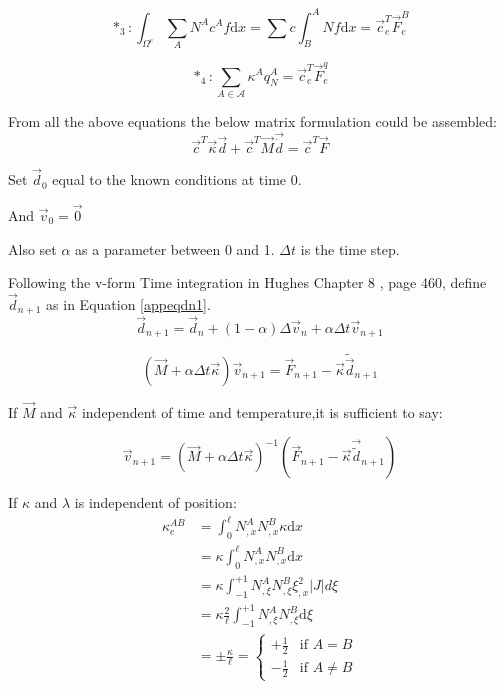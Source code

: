 \begin{equation*}
*_3: \int_{\Omega^e} \sum_A N^A c^A f \text{d}x = \sum c \int_B^A N f \text{d}x = \vec{c}_e^T \vec{F}_e^B
\end{equation*}


\begin{equation*}
*_4: \sum_{A \in \mathcal{A}} \kappa^A q_N^A = \vec{c}_e^T \vec{F}_e^q
\end{equation*}


From all the above equations the below matrix formulation could be assembled:
\begin{equation}\label{appfemdiffeq7}
\vec{c}^T \vec{\kappa} \vec{d} + \vec{c}^T \vec{M} \vec{\dot{d}} = \vec{c}^T \vec{F}
\end{equation}





Set $\vec{d}_0$ equal to the known conditions at time 0.

And $\vec{v}_0 = \vec{0}$ 

Also set $\alpha$ as a parameter between 0 and 1. $\Delta t$ is the time step.


Following the v-form Time integration in Hughes Chapter 8 , page 460, define $\vec{d}_{n+1}$ as in Equation \ref{appeqdn1}.
\begin{equation}\label{appeqdn1}
\vec{d}_{n+1} = \vec{d}_n + (1-\alpha) \Delta \vec{v}_n + \alpha \Delta t \vec{v}_{n+1}
\end{equation}


\begin{equation}
(\vec{M} + \alpha\Delta t \vec{\kappa})\vec{v}_{n+1} = \vec{F}_{n+1} - \vec{\kappa} \tilde{\vec{d}}_{n+1}
\end{equation}


If $\vec{M}$ and $\vec{\kappa}$ independent of time and temperature,it is sufficient to say:

\begin{equation}
\vec{v}_{n+1} = (\vec{M}+\alpha\Delta t \vec{\kappa})^{-1} (\vec{F}_{n+1} - \vec{\kappa} \vec{\tilde{d}}_{n+1})
\end{equation}

If $\kappa$ and $\lambda$ is independent of position:
\begin{equation}
\begin{aligned}
	\kappa_e^{AB} &= \int_0^\ell N_{,x}^A N_{,x}^B \kappa \text{d}x \\
&= \kappa \int_0^\ell N_{,x}^A N_{,x}^B \text{d}x \\
&= \kappa \int_{-1}^{+1} N_{,\xi}^A N_{,\xi}^B \xi_{,x}^2 \left|J\right|  d\xi \\
&=\kappa \frac{2}{\ell} \int_{-1}^{+1} N_{,\xi}^A N_{,\xi}^B \text{d}\xi\\
&= \pm \frac{\kappa}{\ell} = \begin{cases}
+\frac{1}{2} & \text{if } A = B \\
-\frac{1}{2} & \text{if } A \ne B
\end{cases}
\end{aligned}
\end{equation}

